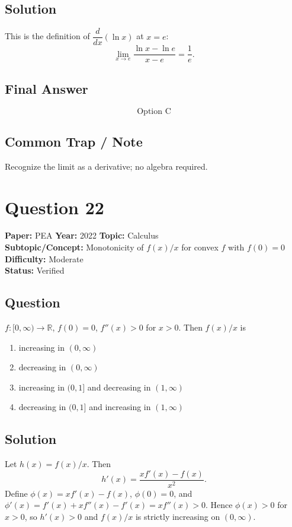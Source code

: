 \documentclass[11pt]{article}
\begin{document}
\subsection*{Solution}
This is the definition of $\dfrac{d}{dx}(\ln x)$ at $x = e$:
\[
\lim_{x \to e} \frac{\ln x - \ln e}{x - e} = \frac{1}{e}.
\]

\subsection*{Final Answer}
\[
\boxed{\text{Option C}}
\]

\subsection*{Common Trap / Note}
Recognize the limit as a derivative; no algebra required.

\section*{Question 22}
\textbf{Paper:} PEA \quad \textbf{Year:} 2022 \quad \textbf{Topic:} Calculus \\
\textbf{Subtopic/Concept:} Monotonicity of $f(x)/x$ for convex $f$ with $f(0)=0$ \quad \textbf{Difficulty:} Moderate \\
\textbf{Status:} Verified

\subsection*{Question}
$f : [0,\infty) \to \mathbb R$, $f(0) = 0$, $f''(x) > 0$ for $x > 0$. Then $f(x)/x$ is
\begin{enumerate}[label=(\Alph*)]
\item increasing in $(0,\infty)$
\item decreasing in $(0,\infty)$
\item increasing in $(0,1]$ and decreasing in $(1,\infty)$
\item decreasing in $(0,1]$ and increasing in $(1,\infty)$
\end{enumerate}

\subsection*{Solution}
Let $h(x) = f(x)/x$. Then
\[
h'(x) = \frac{x f'(x) - f(x)}{x^2}.
\]
Define $\phi(x) = x f'(x) - f(x)$, $\phi(0) = 0$, and $\phi'(x) = f'(x) + x f''(x) - f'(x) = x f''(x) > 0$.
Hence $\phi(x) > 0$ for $x > 0$, so $h'(x) > 0$ and $f(x)/x$ is strictly increasing on $(0,\infty)$.
\end{document}
